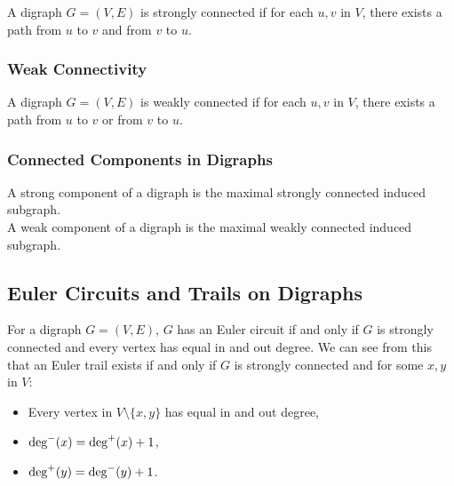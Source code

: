 A digraph $G = (V, E)$ is strongly connected if for each $u, v$
in $V$, there exists a path from $u$ to $v$ and from $v$ to $u$.

\subsubsection{Weak Connectivity}

A digraph $G = (V, E)$ is weakly connected if for each $u, v$
in $V$, there exists a path from $u$ to $v$ or from $v$ to $u$.

\subsubsection{Connected Components in Digraphs}

A strong component of a digraph is the maximal strongly
connected induced subgraph.
\\[\baselineskip]
A weak component of a digraph is the maximal weakly
connected induced subgraph.

\subsection{Euler Circuits and Trails on Digraphs}

For a digraph $G = (V, E)$, $G$ has an Euler circuit if and only 
if $G$ is strongly connected and every vertex has equal in and out
degree. We can see from this that an Euler trail exists if and only
if $G$ is strongly connected and for some $x, y$ in $V$: \begin{itemize}
    \item Every vertex in $V \setminus \{x, y\}$ has equal in and out degree,
    \item $\operatorname{deg}^-(x) = \operatorname{deg}^+(x) + 1$,
    \item $\operatorname{deg}^+(y) = \operatorname{deg}^-(y) + 1$.
\end{itemize}
